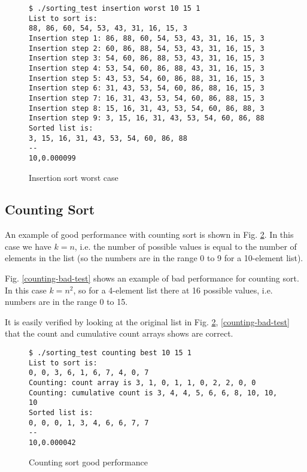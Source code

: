 \documentclass{article}
\begin{document}
\begin{figure}[H]
	\centering
	\begin{BVerbatim}
$ ./sorting_test insertion worst 10 15 1
List to sort is:
88, 86, 60, 54, 53, 43, 31, 16, 15, 3
Insertion step 1: 86, 88, 60, 54, 53, 43, 31, 16, 15, 3
Insertion step 2: 60, 86, 88, 54, 53, 43, 31, 16, 15, 3
Insertion step 3: 54, 60, 86, 88, 53, 43, 31, 16, 15, 3
Insertion step 4: 53, 54, 60, 86, 88, 43, 31, 16, 15, 3
Insertion step 5: 43, 53, 54, 60, 86, 88, 31, 16, 15, 3
Insertion step 6: 31, 43, 53, 54, 60, 86, 88, 16, 15, 3
Insertion step 7: 16, 31, 43, 53, 54, 60, 86, 88, 15, 3
Insertion step 8: 15, 16, 31, 43, 53, 54, 60, 86, 88, 3
Insertion step 9: 3, 15, 16, 31, 43, 53, 54, 60, 86, 88
Sorted list is:
3, 15, 16, 31, 43, 53, 54, 60, 86, 88
--
10,0.000099
	\end{BVerbatim}
	\caption{Insertion sort worst case}
	\label{ins-worst-test}
\end{figure}

\subsection{Counting Sort}

An example of good performance with counting sort is shown in Fig. \ref{counting-good-test}. In this case we have $k=n$, i.e. the number of possible values is equal to the number of elements in the list (so the numbers are in the range 0 to 9 for a 10-element list).

Fig. \ref{counting-bad-test} shows an example of bad performance for counting sort. In this case $k=n^2$, so for a 4-element list there at 16 possible values, i.e. numbers are in the range 0 to 15.

It is easily verified by looking at the original list in Fig. \ref{counting-good-test}, \ref{counting-bad-test} that the count and cumulative count arrays shows are correct.

\begin{figure}[H]
	\centering
	\begin{BVerbatim}
$ ./sorting_test counting best 10 15 1
List to sort is:
0, 0, 3, 6, 1, 6, 7, 4, 0, 7
Counting: count array is 3, 1, 0, 1, 1, 0, 2, 2, 0, 0
Counting: cumulative count is 3, 4, 4, 5, 6, 6, 8, 10, 10, 10
Sorted list is:
0, 0, 0, 1, 3, 4, 6, 6, 7, 7
--
10,0.000042
	\end{BVerbatim}
	\caption{Counting sort good performance}
	\label{counting-good-test}
\end{figure}
\end{document}
